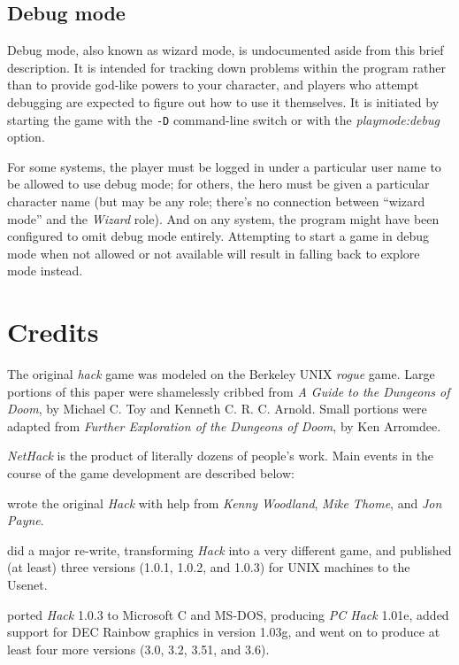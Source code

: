 \subsection*{Debug mode}

Debug mode, also known as wizard mode, is undocumented aside from this
brief description.  It is intended for tracking down problems within the
program rather than to provide god-like powers to your character, and
players who attempt debugging are expected to figure out how to use it
themselves.  It is initiated by starting the game with the
{\tt -D}
command-line switch or with the
{\it playmode:debug\/}
option.

For some systems, the player must be logged in
under a particular user name to be allowed to use debug mode; for others,
the hero must be given a particular character name (but may be any role;
there's no connection between ``wizard mode'' and the {\it Wizard\/} role).
And on any system, the program might have been configured to omit debug
mode entirely.  Attempting to start a game in debug mode when not allowed
or not available will result in falling back to explore mode instead.

\section{Credits}
The original %
{\it hack\/} game was modeled on the Berkeley
UNIX
{\it rogue\/} game.  Large portions of this paper were shamelessly
cribbed from %
{\it A Guide to the Dungeons of Doom}, by Michael C. Toy
and Kenneth C. R. C. Arnold.  Small portions were adapted from
{\it Further Exploration of the Dungeons of Doom}, by Ken Arromdee.

{\it NetHack\/} is the product of literally dozens of people's work.
Main events in the course of the game development are described below:

\bigskip
{} wrote the original {\it Hack\/} with help from {\it
Kenny Woodland}, {\it Mike Thome}, and {\it Jon Payne}.

\medskip
{} did a major re-write, transforming {\it Hack\/}
into a very different game, and published (at least) three versions (1.0.1,
1.0.2, and 1.0.3) for UNIX machines to the Usenet.

\medskip
{} ported {\it Hack\/} 1.0.3 to Microsoft C and MS-DOS,
producing {\it PC Hack\/} 1.01e, added support for DEC Rainbow graphics in
version 1.03g, and went on to produce at least four more versions (3.0, 3.2,
3.51, and 3.6).

